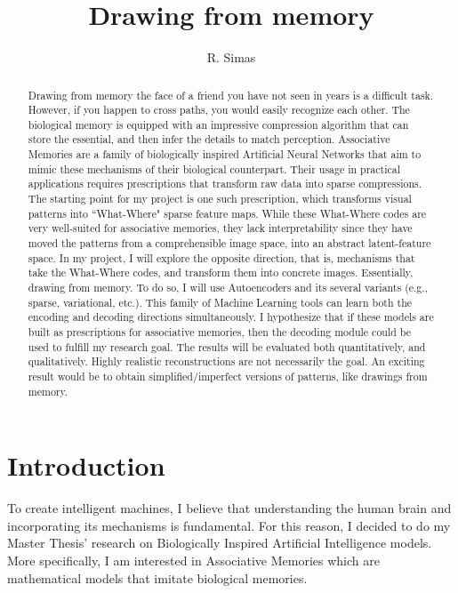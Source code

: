 \documentclass[runningheads]{llncs}
\begin{document}
\title{Drawing from memory}
\author{R. Simas}
\maketitle

\begin{abstract}

Drawing from memory the face of a friend you have not seen in years is a difficult task. However, if you happen to cross paths, you would easily recognize each other.
The biological memory is equipped with an impressive compression algorithm that can store the essential, and then infer the details to match perception.
Associative Memories are a family of biologically inspired Artificial Neural Networks that aim to mimic these mechanisms of their biological counterpart.
Their usage in practical applications requires prescriptions that transform raw data into sparse compressions.
The starting point for my project is one such prescription, which transforms visual patterns into ``What-Where" sparse feature maps.
While these What-Where codes are very well-suited for associative memories, they lack interpretability since they have moved the patterns from a comprehensible image space, into an abstract latent-feature space.
In my project, I will explore the opposite direction, that is, mechanisms that take the What-Where codes, and transform them into concrete images. Essentially, drawing from memory. 
To do so, I will use Autoencoders and its several variants (e.g., sparse, variational, etc.). This family of Machine Learning tools can learn both the encoding and decoding directions simultaneously. I hypothesize that if these models are built as prescriptions for associative memories, then the decoding module could be used to fulfill my research goal.
The results will be evaluated both quantitatively, and qualitatively. Highly realistic reconstructions are not necessarily the goal. An exciting result would be to obtain simplified/imperfect versions of patterns, like drawings from memory.


\end{abstract}

\tableofcontents
\newpage

\section{Introduction}
\label{sec:intro}
To create intelligent machines, I believe that understanding the human brain and incorporating its mechanisms is fundamental. For this reason, I decided to do my Master Thesis' research on Biologically Inspired Artificial Intelligence models. More specifically, I am interested in Associative Memories which are mathematical models that imitate biological memories.
\end{document}
